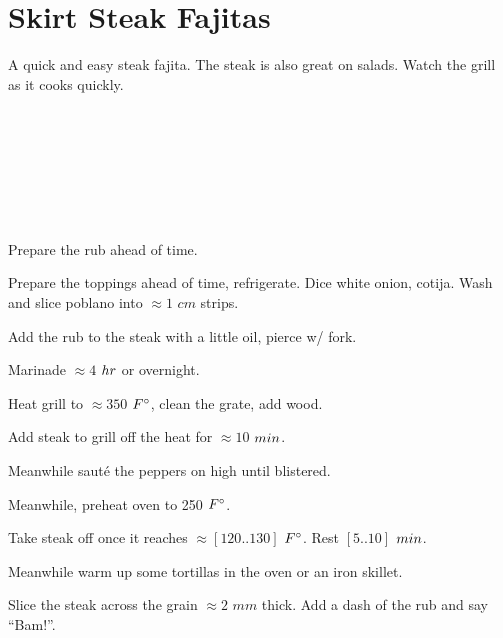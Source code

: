 \section[Steak Fajitas]{Skirt Steak Fajitas}

\begin{recipestats}[
        servings=4,
        preptime=30~\minute,
        bakingtime=15~\minute,
        inactivetime=4~\hour,
        source=Mike \& Jane,
    ]
\end{recipestats}

\begin{recipeabstract}
    A quick and easy steak fajita.
    The steak is also great on salads.
    Watch the grill as it cooks quickly.
\end{recipeabstract}

\begin{ingredientcolumns}[1]
    \begin{ingredientblock}
        \\
        \\
        \\
        \\
        \\
        \\
    \end{ingredientblock}
\end{ingredientcolumns}

\begin{preparation}
\item Prepare the rub ahead of time.
\item Prepare the toppings ahead of time, refrigerate.
    Dice white onion, cotija.
    Wash and slice poblano into $\approx 1$ $cm$ strips.
\item Add the rub to the steak with a little oil, pierce w/ fork.
\item Marinade $\approx 4$ $\hour$ or overnight.
\item Heat grill to $\approx 350$ $\Fahrenheit$, clean the grate, add wood.
\item Add steak to grill off the heat for $\approx 10$ $\minute$.
\item Meanwhile saut\'{e} the peppers on high until blistered.
\item Meanwhile, preheat oven to 250 $\Fahrenheit$.
\item Take steak off once it reaches $\approx [120 .. 130]$ $\Fahrenheit$.
    Rest $[5..10]$ $\minute$.
\item Meanwhile warm up some tortillas in the oven or an iron skillet.
\item Slice the steak across the grain $\approx 2$ $mm$ thick.
    Add a dash of the rub and say ``Bam!''.
\end{preparation}

\recipeend%
